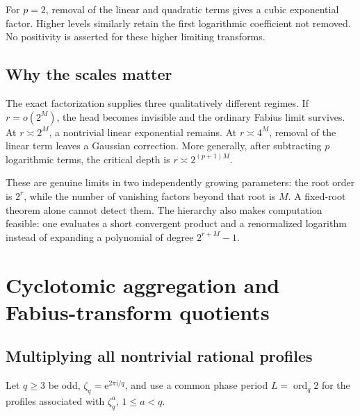 \documentclass[11pt,letterpaper]{article}
\numberwithin{equation}{section}
\theoremstyle{definition}
\theoremstyle{remark}
\newcommand{\ii}{\mathrm i}
\newcommand{\ord}{\operatorname{ord}}
\newcommand{\e}{\mathrm e}
\begin{document}
For \(p=2\), removal of the linear and quadratic terms gives a cubic exponential factor. Higher levels similarly retain the first logarithmic coefficient not removed. No positivity is asserted for these higher limiting transforms.

\subsection{Why the scales matter}
The exact factorization supplies three qualitatively different regimes. If \(r=o(2^M)\), the head becomes invisible and the ordinary Fabius limit survives. At \(r\asymp2^M\), a nontrivial linear exponential remains. At \(r\asymp4^M\), removal of the linear term leaves a Gaussian correction. More generally, after subtracting \(p\) logarithmic terms, the critical depth is \(r\asymp2^{(p+1)M}\).

These are genuine limits in two independently growing parameters: the root order is \(2^r\), while the number of vanishing factors beyond that root is \(M\). A fixed-root theorem alone cannot detect them. The hierarchy also makes computation feasible: one evaluates a short convergent product and a renormalized logarithm instead of expanding a polynomial of degree \(2^{r+M}-1\).

\section{Cyclotomic aggregation and Fabius-transform quotients}
\label{sec:aggregation}

\subsection{Multiplying all nontrivial rational profiles}
Let \(q\geq3\) be odd, \(\zeta_q=\e^{2\pi\ii/q}\), and use a common phase period \(L=\ord_q2\) for the profiles associated with \(\zeta_q^a\), \(1\leq a<q\).
\end{document}
